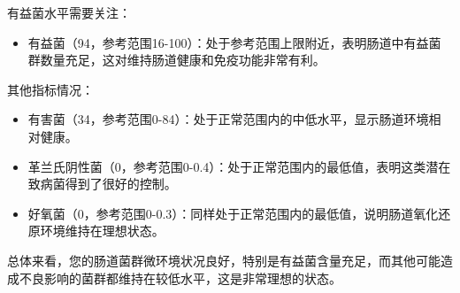 \documentclass[UTF8]{ctexart}
\begin{document}
\begin{center}
\end{center}

\begin{tcolorbox}[
enhanced,
colback=gray!3,
colframe=gray!3,
arc=3mm,
boxrule=0pt,
width=\textwidth,
top=8pt,
bottom=8pt
]
{\small{\textcolor{yellow!85!orange}{\faLightbulb}}\quad 有益菌水平需要关注：
\begin{itemize}
\item 有益菌（94，参考范围16-100）：处于参考范围上限附近，表明肠道中有益菌群数量充足，这对维持肠道健康和免疫功能非常有利。
\end{itemize}

{\textcolor{green!85!orange}{\faLightbulb}}\quad 其他指标情况：
\begin{itemize}
\item 有害菌（34，参考范围0-84）：处于正常范围内的中低水平，显示肠道环境相对健康。
\item 革兰氏阴性菌（0，参考范围0-0.4）：处于正常范围内的最低值，表明这类潜在致病菌得到了很好的控制。
\item 好氧菌（0，参考范围0-0.3）：同样处于正常范围内的最低值，说明肠道氧化还原环境维持在理想状态。
\end{itemize}

总体来看，您的肠道菌群微环境状况良好，特别是有益菌含量充足，而其他可能造成不良影响的菌群都维持在较低水平，这是非常理想的状态。
}
\end{tcolorbox}
\end{document}
